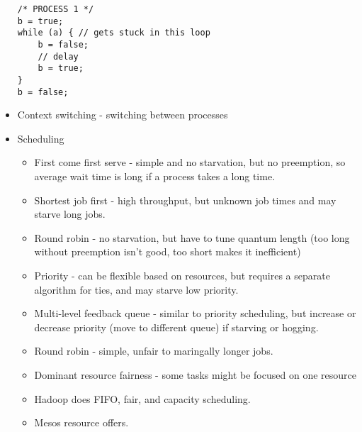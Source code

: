 \documentclass{article}
\begin{document}
\begin{itemize}
\begin{lstlisting}
/* PROCESS 1 */
b = true;
while (a) { // gets stuck in this loop
    b = false;
    // delay
    b = true;
}
b = false;
\end{lstlisting}
    \item Context switching - switching between processes
    \item Scheduling
    \begin{itemize}
        \item First come first serve - simple and no starvation, but no preemption, so average wait time is long if a process takes a long time.
        \item Shortest job first - high throughput, but unknown job times and may starve long jobs.
        \item Round robin - no starvation, but have to tune quantum length (too long without preemption isn't good, too short makes it inefficient)
        \item Priority - can be flexible based on resources, but requires a separate algorithm for ties, and may starve low priority.
        \item Multi-level feedback queue - similar to priority scheduling, but increase or decrease priority (move to different queue) if starving or hogging.
        \item Round robin - simple, unfair to maringally longer jobs.
        \item Dominant resource fairness - some tasks might be focused on one resource
        \item Hadoop does FIFO, fair, and capacity scheduling.
        \item Mesos resource offers.
    \end{itemize}
\end{itemize}
\end{document}
